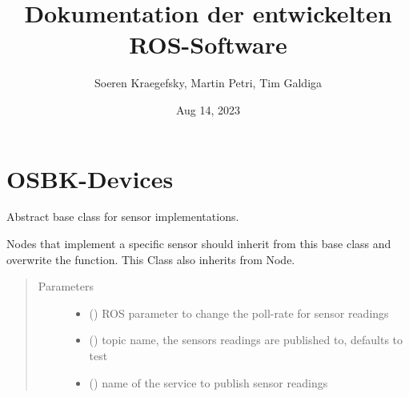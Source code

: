 \documentclass[a4paper,12pt,english]{article}
\title{Dokumentation der entwickelten ROS-Software}
\date{Aug 14, 2023}
\author{Soeren Kraegefsky, Martin Petri, Tim Galdiga}
\begin{document}
\pagestyle{empty}

\pagestyle{plain}

\pagestyle{normal}
\label{\detokenize{index::doc}}



\chapter{OSBK-Devices}
\label{\detokenize{osbk_devices:module-osbk_devices.sensor_base}}\label{\detokenize{osbk_devices:osbk-devices}}\label{\detokenize{osbk_devices::doc}}

\begin{fulllineitems}
\label{\detokenize{osbk_devices:osbk_devices.sensor_base.SensorBase}}
Abstract base class for sensor implementations.

Nodes that implement a specific sensor should inherit from this base class and overwrite the
 function. This Class also inherits from Node.
\begin{quote}\begin{description}
\item[{Parameters}] \leavevmode\begin{itemize}
\item {} 
 () \textendash{} ROS parameter to change the poll-rate for sensor readings

\item {} 
 () \textendash{} topic name, the sensors readings are published to,
defaults to  test

\item {} 
 () \textendash{} name of the service to publish sensor readings


\end{itemize}
\end{description}
\end{quote}
\end{fulllineitems}
\end{document}
